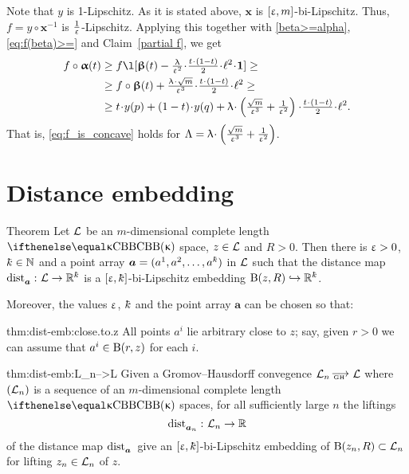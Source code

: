 Note that $y$ is 1-Lipschitz.
As it is stated above, 
$\bm{x}$ is $[\upvarepsilon,m]$-bi-Lipschitz.
Thus, $f=y\circ\bm{x}^{-1}$ is $\tfrac1{\upvarepsilon}$-Lipschitz.
Applying this 
together with \ref{beta>=alpha}, 
\ref{eq:f(beta)>=}
and Claim~\ref{partial f},
we get 
\begin{align*}
f\circ\bm{\alpha}(t)
&\ge 
f
\l[
\bm{\beta}(t)
-
\tfrac\lambda{\eps^2}\cdot\tfrac{t\cdot(1-t)}2\cdot\ell^2\cdot\bm{1}
]
\ge
\\
&
\ge
f\circ\bm{\beta}(t)
+
\tfrac{\lambda
\cdot 
\sqrt{m}}{\eps^3}
\cdot
\tfrac{t\cdot(1-t)}2
\cdot
\ell^2
\ge
\\
&
\ge
t\cdot y(p)
+(1-t)\cdot y(q)+
\lambda\cdot\left(\tfrac{\sqrt{m}}{\eps^3}+\tfrac1{\eps^2}\right)
\cdot 
\tfrac{t\cdot(1-t)}2
\cdot
\ell^2.
\end{align*}
That is, \ref{eq:f_is_concave} holds for $\Lambda=\lambda\cdot\left(\tfrac{\sqrt{m}}{\eps^3}+\tfrac1{\eps^2}\right)$.
\qeds

\section{Distance embedding}\label{sec:dist-embedding}


\begin{thm}{Theorem}\label{thm:dist-emb}
Let $\mathcal{L}$ be an $m$-dimensional complete length $\Alex\kappa$ space, $z\in\spc{L}$ and $R>0$.
Then there is $\upvarepsilon>0$, 
$\kay\in\NN$ 
and a point array $\bm{a}=(a^1,a^2,\dots,a^\kay)$ in $\mathcal{L}$
such that the distance map $\distfun{\bm{a}}{}{}\:\spc{L}\to\RR^\kay$ is a $[\eps,\kay]$-bi-Lipschitz embedding $\oBall(z,R)\hookrightarrow\RR^\kay$.

Moreover, the values $\upvarepsilon$, $\kay$ and the point array $\bm{a}$ can be chosen so that:

\begin{subthm}{thm:dist-emb:close.to.z}
All points $a^i$ lie arbitrary close to $z$;
say, given $r>0$ we can assume that $a^i\in\oBall(r,z)$ for each $i$.
\end{subthm}

\begin{subthm}{thm:dist-emb:L_n-->L}
Given a Gromov--Hausdorff convegence
$\spc{L}_n\GHto\spc{L}$ where $(\mathcal{L}_n)$ is a sequence of an $m$-dimensional complete length $\Alex\kappa$ spaces,
for all sufficiently large $n$
the liftings \[\distfun{\bm{a}_n}{}{}\:\spc{L}_n\to\RR\] of the distance map $\mathop{\rm dist}\nolimits_{\bm{a}}^{{}}{}{}$ 
give an $[\eps,\kay]$-bi-Lipschitz embedding of $\oBall(z_n,R)\subset \spc{L}_n$ for lifting $z_n\in\spc{L}_n$ of $z$.
\end{subthm}
\end{thm}

